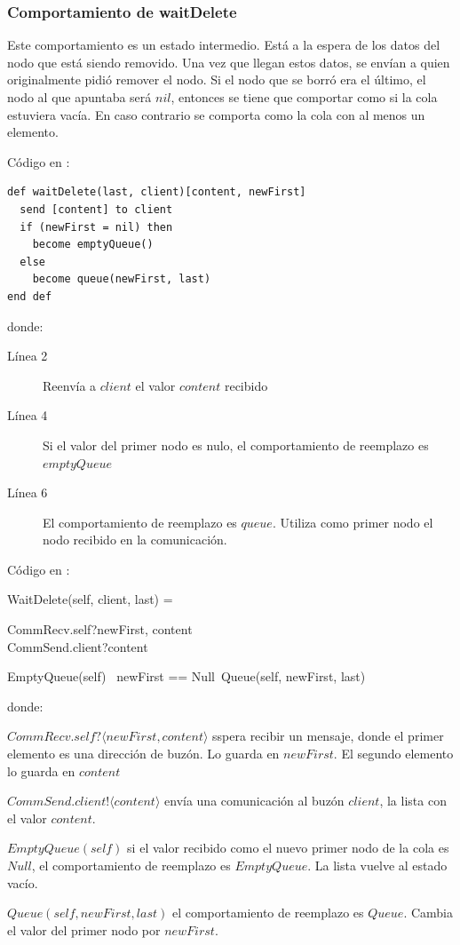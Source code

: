 \subsubsection*{Comportamiento de waitDelete}
Este comportamiento es un estado intermedio. Está a la espera de los datos del nodo que está siendo removido. Una vez que llegan estos datos, se envían a quien originalmente pidió remover el nodo. Si el nodo que se borró era el último, el nodo al que apuntaba será $nil$, entonces se tiene que comportar como si la cola estuviera vacía. En caso contrario se comporta como la cola con al menos un elemento.

Código en \SAL:

\begin{lstlisting}[language=sal, style=simple]
def waitDelete(last, client)[content, newFirst]
  send [content] to client
  if (newFirst = nil) then
    become emptyQueue()
  else
    become queue(newFirst, last)
end def
\end{lstlisting}
donde: 
\begin{description}
 \item [Línea 2] Reenvía a $client$ el valor $content$ recibido
 \item [Línea 4] Si el valor del primer nodo es nulo, el comportamiento de reemplazo es $emptyQueue$
 \item [Línea 6] El comportamiento de reemplazo es $queue$. Utiliza como primer nodo el nodo recibido en la comunicación.
\end{description}

Código en \CSP:

\begin{process}
WaitDelete(self, client, last) = \\ \quad
  \begin{block}
  CommRecv.self?\langle newFirst, content \rangle \then \\ 
  CommSend.client?\langle content \rangle \then \\ \quad
    \begin{block}
         EmptyQueue(self) \lceil\ newFirst == Null\ \rceil  Queue(self, newFirst, last) 
    \end{block} 
  \end{block}
\end{process}
donde:
\begin{description}
 \item $CommRecv.self?\langle newFirst, content \rangle$ sspera recibir un mensaje, donde el primer elemento es una dirección de buzón. Lo guarda en $newFirst$. El segundo elemento lo guarda en $content$
 \item $CommSend.client!\langle content \rangle$ envía una comunicación al buzón $client$, la lista con el valor $content$. 
 \item $EmptyQueue(self)$ si el valor recibido como el nuevo primer nodo de la cola es $Null$, el comportamiento de reemplazo es $EmptyQueue$. La lista vuelve al estado vacío.
 \item $Queue(self, newFirst, last)$ el comportamiento de reemplazo es $Queue$. Cambia el valor del primer nodo por $newFirst$.
 \end{description}
 
